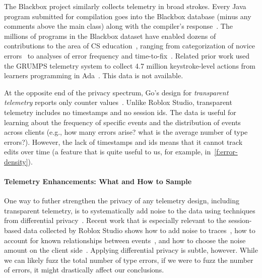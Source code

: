 \documentclass[english,submission,cleveref]{programming}
\begin{document}
The Blackbox project similarly collects telemetry in broad strokes.
Every Java program submitted for compilation goes into the Blackbox database (minus
any comments above the main class) along with the compiler's response~\cite{bkmu-sigcse-2014}.
The millions of programs in the Blackbox dataset
have enabled dozens of contributions to the area of CS
education~\cite{bask-icer-2018}, ranging from categorization of novice
errors~\cite{mk-fie-2014,m-masters-2016} to analyses of error frequency and
time-to-fix~\cite{ab-sigcse-2015}.
Related prior work used the GRUMPS telemetry system to collect 4.7 million
keystroke-level actions from learners programming in
Ada~\cite{tm-iticse-2004,tkdmceg-ascilite-2003}.
This data is not available.

At the opposite end of the privacy spectrum, Go's design for \emph{transparent
telemetry} reports only counter values~\cite{transparent-telemetry}.
Unlike Roblox Studio, transparent telemetry includes no timestamps and no 
session ids.
The data is useful for learning about the frequency of specific events and the
distribution of events across clients (e.g., how many 
errors arise? what is the average number of type errors?).
However, the lack of timestamps and ids means that it cannot track edits
over time (a feature that is quite useful to us, for example, in~\cref{f:error-density}).


\paragraph{Telemetry Enhancements: What and How to Sample}

One way to futher strengthen the privacy of any telemetry design, including
transparent telemetry, is to systematically add noise to the data using
techniques from differential
privacy~\cite{zhlbr-cc-2020,epk-ccs-2014,wblj-usenix-2017}.
Recent work that is especially relevant to the session-based data collected
by Roblox Studio shows how to add noise to traces~\cite{zhlbr-cc-2020},
how to account for known relationships between events~\cite{zhlbr-oopsla-2020},
and how to choose the noise amount on the client side~\cite{hlzbr-ecoop-2021}.
Applying differential privacy is subtle, however.
While we can likely fuzz the total number of type errors, if we were to
fuzz the number of  errors, it might drastically
affect our conclusions.
\end{document}
